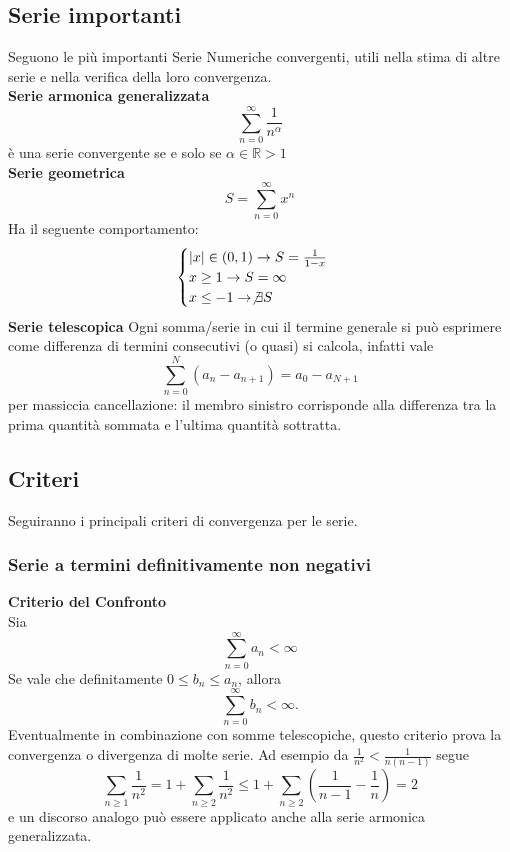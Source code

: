\documentclass[a4paper,twoside]{article}
\newcommand{\R}{\mathbb{R}}
\theoremstyle{definition}
\numberwithin{theorem}{section}
\begin{document}
    \subsection{Serie importanti}
Seguono le più importanti Serie Numeriche convergenti, utili nella stima di altre serie e nella verifica della loro convergenza.\\
\textbf{Serie armonica generalizzata}
$$\sum_{n=0}^{\infty}\frac{1}{n^\alpha}$$
è una serie convergente se e solo se
$\alpha\in\R>1$
\\
\textbf{Serie geometrica}
$$S=\sum_{n=0}^{\infty}x^n$$
Ha il seguente comportamento:
\begin{equation*}
\begin{cases}
    |x|\in(0,1) \rightarrow S=\frac{1}{1-x}
    \\x \geq 1 \rightarrow S=\infty
    \\x\leq -1 \rightarrow \not\exists S
    
\end{cases}
\end{equation*}
\textbf{Serie telescopica}
Ogni somma/serie in cui il termine generale si può esprimere come differenza di termini consecutivi (o quasi) si calcola, infatti vale
$$\sum_{n=0}^{N}\left(a_n - a_{n+1}\right) = a_0 - a_{N+1}$$
per massiccia cancellazione: il membro sinistro corrisponde alla differenza tra la prima quantità sommata e l'ultima quantità sottratta.

\subsection{Criteri}
Seguiranno i principali criteri di convergenza per le serie.
\subsubsection{Serie a termini definitivamente non negativi}
\textbf{Criterio del Confronto} \\
Sia
$$\sum_{n=0}^{\infty}a_n<\infty$$
Se vale che definitamente $0\leq b_n\leq a_n$, allora
$$\sum_{n=0}^{\infty}b_n<\infty.$$
Eventualmente in combinazione con somme telescopiche, questo criterio prova la convergenza o divergenza di molte serie. Ad esempio da $\frac{1}{n^2}<\frac{1}{n(n-1)}$ segue 
$$ \sum_{n\geq 1}\frac{1}{n^2} = 1+\sum_{n\geq 2}\frac{1}{n^2} \leq 1+\sum_{n\geq 2}\left(\frac{1}{n-1}-\frac{1}{n}\right) = 2 $$
e un discorso analogo può essere applicato anche alla serie armonica generalizzata.\\
\end{document}
